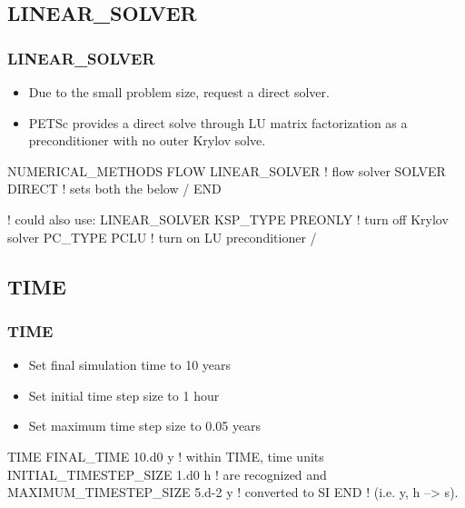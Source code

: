\documentclass{beamer}
\newcommand\redcomment[1]{{{\color{red} #1}}}
\newcommand\bluecomment[1]{{{\color{blue} #1}}}
\newcommand\greencomment[1]{{{\color{green} #1}}}
\begin{document}
\subsection{LINEAR\_SOLVER}

\begin{frame}[fragile]\frametitle{LINEAR\_SOLVER}

\begin{itemize}
\item Due to the small problem size, request a direct solver.
\item PETSc provides a direct solve through LU matrix factorization as a preconditioner with no outer Krylov solve.
\end{itemize}

\begin{semiverbatim}

NUMERICAL_METHODS FLOW
  LINEAR_SOLVER          \bluecomment{! flow solver}
    SOLVER DIRECT        \bluecomment{! sets both the below}
  /
END

  \bluecomment{! could also use:}
  LINEAR_SOLVER
    KSP_TYPE PREONLY     \bluecomment{! turn off Krylov solver}
    PC_TYPE PCLU         \bluecomment{! turn on LU preconditioner}
  /
\end{semiverbatim}

\end{frame}

\subsection{TIME}

\begin{frame}[fragile]\frametitle{TIME}

\begin{itemize}
\item Set final simulation time to 10 years
\item Set initial time step size to 1 hour
\item Set maximum time step size to 0.05 years
\end{itemize}


\begin{semiverbatim}

TIME
  FINAL_TIME 10.d0 \redcomment{y}            \bluecomment{! within TIME, time units}
  INITIAL_TIMESTEP_SIZE 1.d0 \redcomment{h}  \bluecomment{!   are recognized and}
  MAXIMUM_TIMESTEP_SIZE 5.d-2 \redcomment{y} \bluecomment{!   converted to SI}
END                             \bluecomment{! (i.e. \redcomment{y}, \redcomment{h} --> \greencomment{s}).}
\end{semiverbatim}

\end{frame}
\end{document}
